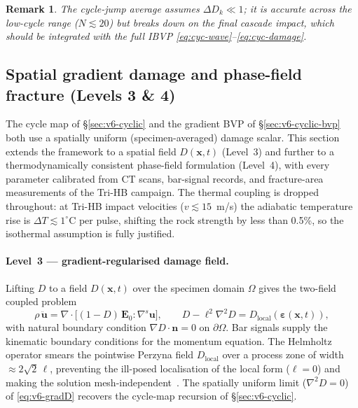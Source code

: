 \documentclass[11pt,a4paper,openany]{book}
\theoremstyle{handbook}
\newtheorem{remark}{Remark}[chapter]
\begin{document}
\begin{remark}
The cycle-jump average assumes $\Delta D_k\ll1$; it is accurate across the
low-cycle range ($N\!\lesssim\!20$) but breaks down on the final cascade impact,
which should be integrated with the full IBVP
\eqref{eq:cyc-wave}--\eqref{eq:cyc-damage}.
\end{remark}

\subsection{Spatial gradient damage and phase-field fracture (Levels 3 \& 4)}\label{sec:v6-spatial}

The cycle map of \S\ref{sec:v6-cyclic} and the gradient BVP of
\S\ref{sec:v6-cyclic-bvp} both use a spatially uniform (specimen-averaged)
damage scalar.  This section extends the framework to a spatial field
$D(\mathbf{x},t)$ (Level~3) and further to a thermodynamically consistent
phase-field formulation (Level~4), with every parameter calibrated from CT
scans, bar-signal records, and fracture-area measurements of the Tri-HB
campaign.  The thermal coupling is dropped throughout: at Tri-HB impact
velocities ($v\lesssim15$~m/s) the adiabatic temperature rise is
$\Delta T\lesssim1^{\circ}$C per pulse, shifting the rock strength by less than
0.5\%, so the isothermal assumption is fully justified.

\paragraph{Level~3 --- gradient-regularised damage field.}
Lifting $D$ to a field $D(\mathbf{x},t)$ over the specimen domain $\Omega$ gives
the two-field coupled problem
%
\begin{equation}
\rho\,\ddot{\mathbf{u}}=\nabla\cdot\big[(1-D)\,\mathbf{E}_0:\nabla^s\mathbf{u}\big],
\qquad
D-\ell^2\nabla^2 D=D_{\mathrm{local}}\!\left(\boldsymbol\varepsilon(\mathbf{x},t)\right),
\label{eq:v6-gradD}
\end{equation}
%
with natural boundary condition $\nabla D\cdot\mathbf{n}=0$ on $\partial\Omega$.
Bar signals supply the kinematic boundary conditions for the momentum equation.
The Helmholtz operator smears the pointwise Perzyna field $D_{\mathrm{local}}$
over a process zone of width ${\approx}2\sqrt{2}\,\ell$, preventing the
ill-posed localisation of the local form ($\ell=0$) and making the solution
mesh-independent~\cite{pijaudier1987}.  The spatially uniform limit
($\nabla^2 D=0$) of \eqref{eq:v6-gradD} recovers the cycle-map recursion of
\S\ref{sec:v6-cyclic}.
\end{document}
